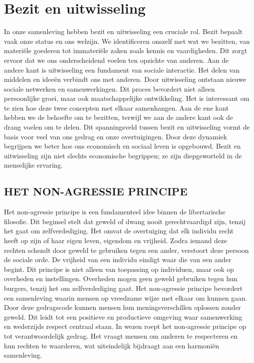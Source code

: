 \documentclass[
  a5paper,
  smalldemyvopaper,10pt,twoside,onecolumn,openright,extrafontsizes,hidelinks]{memoir}
\begin{document}

\chapter{Bezit en uitwisseling}\label{bezit-en-uitwisseling}

In onze samenleving hebben bezit en uitwisseling een cruciale rol. Bezit
bepaalt vaak onze status en ons welzijn. We identificeren onszelf met
wat we bezitten, van materiële goederen tot immateriële zaken zoals
kennis en vaardigheden. Dit zorgt ervoor dat we ons onderscheidend
voelen ten opzichte van anderen. Aan de andere kant is uitwisseling een
fundament van sociale interactie. Het delen van middelen en ideeën
verbindt ons met anderen. Door uitwisseling ontstaan nieuwe sociale
netwerken en samenwerkingen. Dit proces bevordert niet alleen
persoonlijke groei, maar ook maatschappelijke ontwikkeling. Het is
interessant om te zien hoe deze twee concepten met elkaar samenhangen.
Aan de ene kant hebben we de behoefte om te bezitten, terwijl we aan de
andere kant ook de drang voelen om te delen. Dit spanningsveld tussen
bezit en uitwisseling vormt de basis voor veel van ons gedrag en onze
overtuigingen. Door deze dynamiek begrijpen we beter hoe ons economisch
en sociaal leven is opgebouwd. Bezit en uitwisseling zijn niet slechts
economische begrippen; ze zijn diepgeworteld in de menselijke ervaring.

\section{HET NON-AGRESSIE PRINCIPE}\label{het-non-agressie-principe}

Het non-agressie principe is een fundamenteel idee binnen de
libertarische filosofie. Dit beginsel stelt dat geweld of dwang nooit
gerechtvaardigd zijn, tenzij het gaat om zelfverdediging. Het omvat de
overtuiging dat elk individu recht heeft op zijn of haar eigen leven,
eigendom en vrijheid. Zodra iemand deze rechten schendt door geweld te
gebruiken tegen een ander, verstoort deze persoon de sociale orde. De
vrijheid van een individu eindigt waar die van een ander begint. Dit
principe is niet alleen van toepassing op individuen, maar ook op
overheden en instellingen. Overheden mogen geen geweld gebruiken tegen
hun burgers, tenzij het om zelfverdediging gaat. Het non-agressie
principe bevordert een samenleving waarin mensen op vreedzame wijze met
elkaar om kunnen gaan. Door deze gedragscode kunnen mensen hun
meningsverschillen oplossen zonder geweld. Dit leidt tot een positieve
en productieve omgeving waar samenwerking en wederzijds respect centraal
staan. In wezen roept het non-agressie principe op tot verantwoordelijk
gedrag. Het vraagt mensen om anderen te respecteren en hun rechten te
waarderen, wat uiteindelijk bijdraagt aan een harmoniën samenleving.
\end{document}
